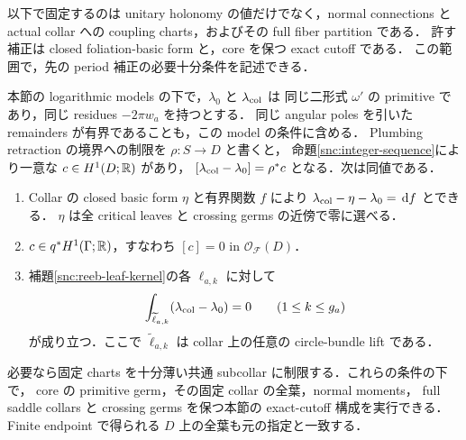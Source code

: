 以下で固定するのは unitary holonomy の値だけでなく，normal connections と
actual collar への coupling charts，およびその full fiber partition である．
許す補正は closed foliation-basic form と，core を保つ exact cutoff である．
この範囲で，先の period 補正の必要十分条件を記述できる．

\begin{proposition}
\label{snc:fixed-holonomy}
本節の logarithmic models の下で，$\lambda_0$ と $\lambda_{\rm col}$ は
同じ二形式 $\omega'$ の primitive であり，同じ residues $-2\pi w_a$ を持つとする．
同じ angular poles を引いた remainders が有界であることも，この model の条件に含める．
Plumbing retraction の境界への制限を $\rho:S\to D$ と書くと，
命題\ref{snc:integer-sequence}により一意な $c\in H^1(D;\mathbb R)$ があり，
$[\lambda_{\rm col}-\lambda_0]=\rho^*c$ となる．次は同値である．
\begin{enumerate}
\item Collar の closed basic form $\eta$ と有界関数 $f$ により
  $\lambda_{\rm col}-\eta-\lambda_0=\,\mathrm d f$ とできる．
  $\eta$ は全 critical leaves と crossing germs の近傍で零に選べる．
\item $c\in q^*H^1(\Gamma;\mathbb R)$，すなわち $[c]=0$ in $\mathcal O_{\mathcal F}(D)$．
\item 補題\ref{snc:reeb-leaf-kernel}の各 $\ell_{a,k}$ に対して
  \begin{equation}\label{snc:fixed-leaf-period-test}
   \int_{\widetilde\ell_{a,k}}(\lambda_{\rm col}-\lambda_0)=0
   \qquad(1\le k\le g_a)
  \end{equation}
  が成り立つ．ここで $\widetilde\ell_{a,k}$ は collar 上の任意の circle-bundle lift である．
\end{enumerate}
必要なら固定 charts を十分薄い共通 subcollar に制限する．これらの条件の下で，
core の primitive germ，その固定 collar の全葉，normal moments，
full saddle collars と crossing germs を保つ本節の exact-cutoff 構成を実行できる．
Finite endpoint で得られる $D$ 上の全葉も元の指定と一致する．
\end{proposition}

